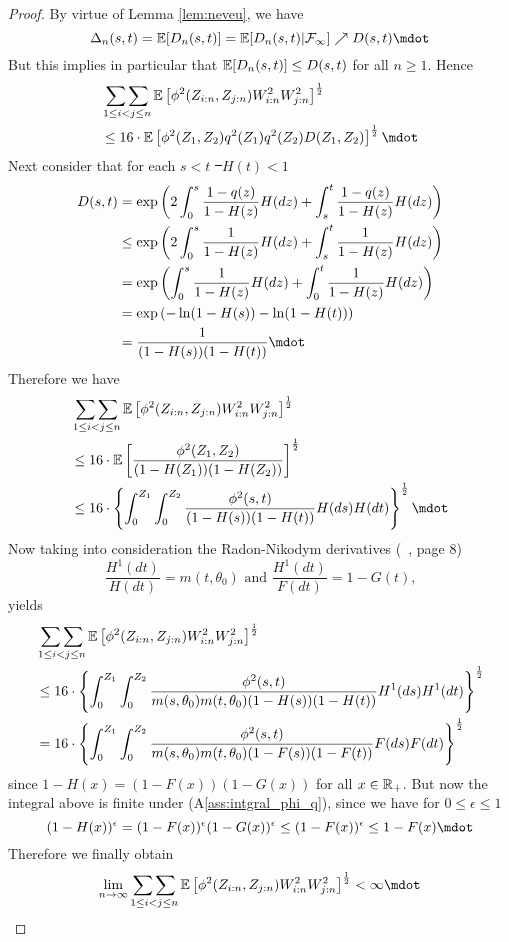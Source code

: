 \begin{lemma}
\begin{proof}
		By virtue of Lemma \ref{lem:neveu}, we have
		$$\Delta_{n}(s,t) = \E[D_n(s,t)] = \E[D_n(s,t)|\F_\infty] \nearrow D(s,t)\mdot$$
		But this implies in particular that $\mathbb{E}[D_n(s,t)] \leq D(s,t)$ for all $n\geq 1$. Hence 
		\begin{align*}
			&\doublesum\limits_{1\leq i<j\leq n}\E\left[\phi^2(Z_{i:n}, Z_{j:n}) W^2_{i:n} W^2_{j:n}\right]^{\frac{1}{2}}\\
			&\leq 16\cdot\E\left[\phi^2(Z_{1}, Z_{2}) q^2(Z_{1})q^2(Z_{2})D(Z_1,Z_2)\right]^{\frac{1}{2}}\mdot
		\end{align*}		
		Next consider that for each $s<t$ \st\ $H(t)<1$
		\begin{align*}
			D(s,t) &= \exp\left(2\int_{0}^{s} \frac{1-q(z)}{1-H(z)} H(dz) + \int_{s}^{t} \frac{1-q(z)}{1-H(z)} H(dz)\right)\\
			&\leq \exp\left(2\int_{0}^{s} \frac{1}{1-H(z)} H(dz) + \int_{s}^{t} \frac{1}{1-H(z)} H(dz)\right)\\
			&= \exp\left(\int_{0}^{s} \frac{1}{1-H(z)} H(dz) + \int_{0}^{t} \frac{1}{1-H(z)} H(dz)\right)\\
			&= \exp\left(-\ln(1-H(s)) -\ln(1-H(t))\right)\\
			&= \frac{1}{(1-H(s))(1-H(t))}\mdot
		\end{align*}
		Therefore we have
		\begin{align*}
			&\doublesum\limits_{1\leq i<j\leq n}\E\left[\phi^2(Z_{i:n}, Z_{j:n}) W^2_{i:n} W^2_{j:n}\right]^{\frac{1}{2}}\\
			&\leq 16\cdot\E\left[\frac{\phi^2(Z_{1}, Z_{2})}{(1-H(Z_1))(1-H(Z_2))}\right]^{\frac{1}{2}}\\
			&\leq 16\cdot\left\{\int_{0}^{Z_1} \int_{0}^{Z_2}\frac{\phi^2(s, t)}{(1-H(s))(1-H(t))} H(ds)H(dt)\right\}^{\frac{1}{2}}\mdot
		\end{align*}		
		Now taking into consideration the Radon-Nikodym derivatives (\cf\ \cite{dikta2000strong}, page 8)
		$$\frac{H^1(dt)}{H(dt)} = m(t,\theta_0) \textrm{ and } \frac{H^1(dt)}{F(dt)} = 1-G(t) \textrm{,}$$
		yields
		\begin{align*}
			&\mathop{\sum\sum}\limits_{1\leq i<j\leq n}\mathbb{E}\left[\phi^2(Z_{i:n}, Z_{j:n}) W^2_{i:n} W^2_{j:n}\right]^{\frac{1}{2}}\\
			&\leq 16\cdot\left\{\int_{0}^{Z_1} \int_{0}^{Z_2}\frac{\phi^2(s, t)}{m(s,\theta_0)m(t, \theta_0)(1-H(s))(1-H(t))} H^1(ds)H^1(dt)\right\}^{\frac{1}{2}}\\
			&= 16\cdot\left\{\int_{0}^{Z_1} \int_{0}^{Z_2}\frac{\phi^2(s, t)}{m(s,\theta_0)m(t, \theta_0)(1-F(s))(1-F(t))} F(ds)F(dt)\right\}^{\frac{1}{2}}
		\end{align*}	
		since $1-H(x) = (1-F(x))(1-G(x))$ for all $x\in \mathbb{R}_+$. But now the integral above is finite under (A\ref{ass:intgral_phi_q}), since we have for $0\leq \epsilon\leq 1$
		$$(1-H(x))^\epsilon = (1-F(x))^\epsilon(1-G(x))^\epsilon \leq (1-F(x))^\epsilon \leq 1-F(x) \mdot$$
		Therefore we finally obtain
		$$\lim\limits_{n\to\infty}\doublesum\limits_{1\leq i<j\leq n}\E\left[\phi^2(Z_{i:n}, Z_{j:n}) W^2_{i:n} W^2_{j:n}\right]^{\frac{1}{2}} < \infty\mdot$$
	\end{proof}
\end{lemma}	
